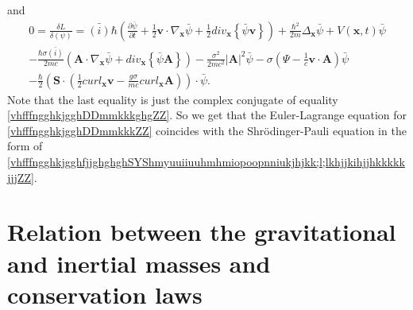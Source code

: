 \documentclass{article}
\theoremstyle{definition}
\theoremstyle{remark}
\renewcommand{\vec}[1]{\mathbf{#1}}
\newcommand{\er}{\eqref}
\newcommand{\er}{\eqref}
\begin{document}
and
\begin{multline}\label{vhfffngghkjgghDDmmkkkghguhyuyZZ}
0=\frac{\delta L}{\delta (\psi)}= \bar
{(i)}\hbar\left(\frac{\partial\bar\psi}{\partial t}+\frac{1}{2}\vec
v\cdot\nabla_{\vec x}\bar\psi+\frac{1}{2}div_{\vec
x}\left\{\bar\psi\vec
v\right\}\right)+\frac{\hbar^2}{2m}\Delta_{\vec x}\bar\psi
+V\left(\vec
x,t\right)\bar\psi\\
-\frac{\hbar\sigma \bar {(i)}}{2mc}\left(\vec A\cdot\nabla_{\vec
x}\bar\psi+div_{\vec x}\left\{\bar\psi\vec
A\right\}\right)-\frac{\sigma^2}{2mc^2}\left|\vec A\right|^2\bar\psi
-\sigma\left(\Psi-\frac{1}{c}\vec v\cdot\vec A\right)\bar\psi
\\-\frac{\hbar}{2}\left(\vec S\cdot\left(\frac{1}{2}curl_{\vec x}\vec
v-\frac{g\sigma}{mc}curl_{\vec x}\vec A\right)\right)\cdot\bar\psi.
\end{multline}
Note that the last equality is just the complex conjugate of
equality \er{vhfffngghkjgghDDmmkkkghgZZ}. So we get that the
Euler-Lagrange equation for \er{vhfffngghkjgghDDmmkkkZZ} coincides
with the Shr\"{o}dinger-Pauli equation in the form of
\er{vhfffngghkjgghfjjghghghSYShmyuuiiuuhmhmiopoopnniukjhjkk;l;lkhjjkihjjhkkkkkjjjZZ}.




















\section{Relation between the gravitational and inertial masses and
conservation laws}\label{GravElectro}
\end{document}

